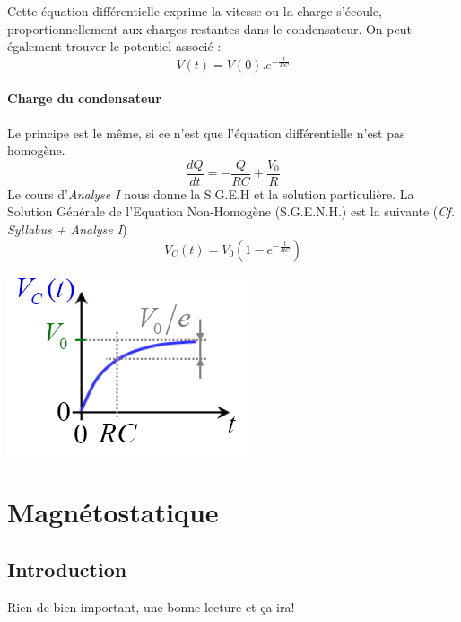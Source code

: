 \documentclass	[11pt, a4paper, openany]{book}
\begin{document}
Cette équation différentielle exprime la vitesse ou la charge s'écoule, proportionnellement aux charges restantes dans le condensateur. On peut également trouver le potentiel associé :
\begin{equation}
V(t) = V(0).e^{-\frac{t}{RC}}
\end{equation}
\subsubsection{Charge du condensateur}
Le principe est le même, si ce n'est que l'équation différentielle n'est pas homogène.
\begin{equation}
\frac{dQ}{dt} = -\frac{Q}{RC} + \frac{V_0}{R}
\end{equation}
Le cours d'\textit{Analyse I} nous donne la S.G.E.H et la solution particulière. La Solution Générale de l'Equation Non-Homogène (S.G.E.N.H.) est la suivante (\textit{Cf. Syllabus + Analyse I})
\begin{equation}
V_C(t) = V_0\left(1 - e^{-\frac{t}{RC}} \right)
\end{equation}
\begin{center}
\includegraphics[scale=0.6]{es/image21.png}
\end{center}














\chapter{Magnétostatique}
\section{Introduction}
Rien de bien important, une bonne lecture et ça ira!
\end{document}
